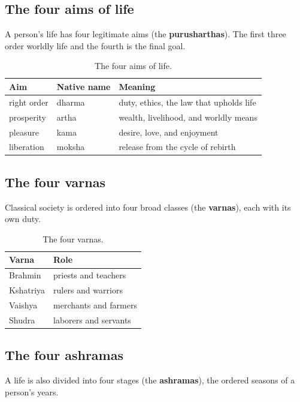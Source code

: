 \subsection{The four aims of life}

A person's life has four legitimate aims (the \textbf{purusharthas}). The first three order worldly life and the fourth is the final goal.

\begin{longtable}{@{} L{0.20\textwidth}L{0.20\textwidth}L{0.42\textwidth}@{}}
\caption{The four aims of life.}\\
\toprule
\textbf{Aim} & \textbf{Native name} & \textbf{Meaning} \\
\midrule
right order & dharma & duty, ethics, the law that upholds life \\
prosperity & artha & wealth, livelihood, and worldly means \\
pleasure & kama & desire, love, and enjoyment \\
liberation & moksha & release from the cycle of rebirth \\
\bottomrule
\end{longtable}

\subsection{The four varnas}

Classical society is ordered into four broad classes (the \textbf{varnas}), each with its own duty.

\begin{longtable}{@{} L{0.26\textwidth}L{0.56\textwidth}@{}}
\caption{The four varnas.}\\
\toprule
\textbf{Varna} & \textbf{Role} \\
\midrule
Brahmin & priests and teachers \\
Kshatriya & rulers and warriors \\
Vaishya & merchants and farmers \\
Shudra & laborers and servants \\
\bottomrule
\end{longtable}

\subsection{The four ashramas}

A life is also divided into four stages (the \textbf{ashramas}), the ordered seasons of a person's years.

